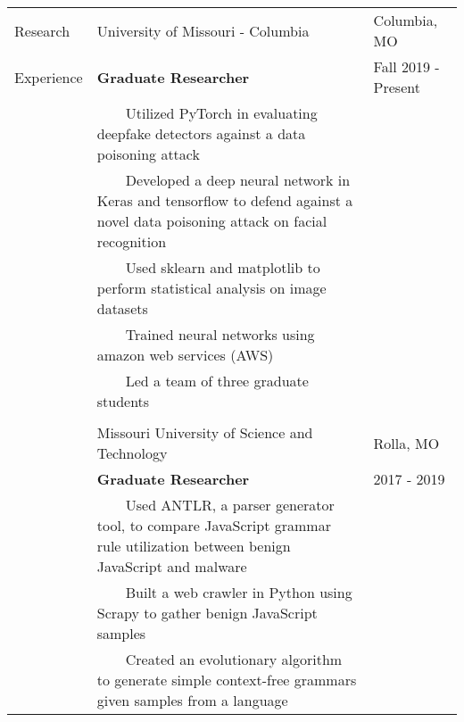 \documentclass[10.5pt, arial]{article}
\newcommand{\tabitem}{~~\llap{\textbullet}~~}
\begin{document}
\begin{tabular}{p{1.5cm} p{13.2cm} l}
Research    & University of Missouri - Columbia                             & Columbia, MO          \\
Experience  & \textbf{Graduate Researcher}                                  & Fall 2019 - Present   \\ 
            & \tabitem Utilized PyTorch in evaluating deepfake detectors against a data poisoning attack \\
            & \tabitem Developed a deep neural network in Keras and tensorflow to defend against a novel data poisoning attack on facial recognition \\
            & \tabitem Used sklearn and matplotlib to perform statistical analysis on image datasets \\
            & \tabitem Trained neural networks using amazon web services (AWS) &                   \\
            & \tabitem Led a team of three graduate students  \\
\\
            & Missouri University of Science and Technology                 & Rolla, MO             \\
            & \textbf{Graduate Researcher}                                  & 2017 - 2019           \\
            & \tabitem Used ANTLR, a parser generator tool, to compare JavaScript grammar rule utilization between benign JavaScript and malware \\
            & \tabitem Built a web crawler in Python using Scrapy to gather benign JavaScript samples \\
            & \tabitem Created an evolutionary algorithm to generate simple context-free grammars given samples from a language \\
\end{tabular}
\end{document}

